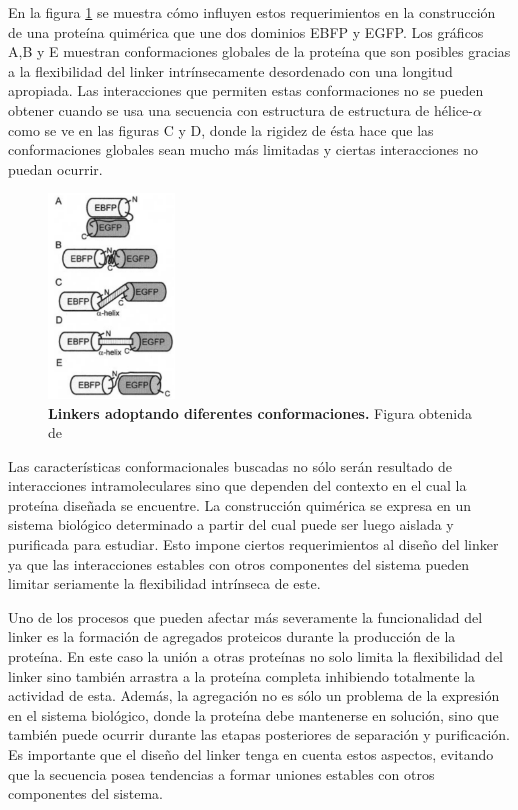 En la figura \ref{conformacionLinker} se muestra cómo influyen estos requerimientos en la construcción de una proteína quimérica que une dos dominios EBFP y EGFP. 
Los gráficos A,B y E muestran conformaciones globales de la proteína que son posibles gracias a la flexibilidad del linker intrínsecamente desordenado con una longitud apropiada. 
Las interacciones que permiten estas conformaciones no se pueden obtener cuando se usa una secuencia con estructura de estructura de hélice-$\alpha$ como se ve en las figuras C y D, donde la rigidez de ésta
hace que las conformaciones globales sean mucho más limitadas y ciertas interacciones no puedan ocurrir.

\begin{figure}[htbp]
\centering
\includegraphics[width=0.3\textwidth]{img/conformacionLinker.png} 
\caption{\textbf{Linkers adoptando diferentes conformaciones.} Figura obtenida de \cite{arai2004conformations}}
\label{conformacionLinker}
\end{figure}


Las características conformacionales buscadas no sólo serán resultado de interacciones intramoleculares sino que dependen del contexto en el cual la proteína diseñada se encuentre. 
La construcción quimérica se expresa en un sistema biológico determinado a partir del cual puede ser luego aislada y purificada para estudiar. 
Esto impone ciertos requerimientos al diseño del linker ya que las interacciones estables con otros componentes del sistema pueden limitar seriamente la flexibilidad intrínseca de este.

Uno de los procesos que pueden afectar más severamente la funcionalidad del linker es la formación de agregados proteicos durante la producción de la proteína\cite{lebendiker2014production}.
En este caso la unión a otras proteínas no solo limita la flexibilidad del linker sino también arrastra a la proteína completa inhibiendo totalmente la actividad de esta.
Además, la agregación no es sólo un problema de la expresión en el sistema biológico, donde la proteína debe mantenerse en solución,
sino que también puede ocurrir durante las etapas posteriores de separación y purificación.
Es importante que el diseño del linker tenga en cuenta estos aspectos, evitando que la secuencia posea tendencias a formar uniones estables con otros componentes del sistema.


